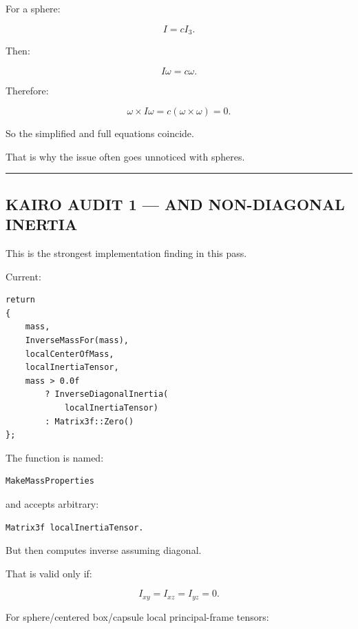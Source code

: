 For a sphere:

\[
I=cI_3.
\]

Then:

\[
I\omega=c\omega.
\]

Therefore:

\[
\omega\times I\omega
=
c(\omega\times\omega)
=
0.
\]

So the simplified and full equations coincide.

That is why the issue often goes unnoticed with spheres.

\begin{center}\rule{0.5\linewidth}{0.5pt}\end{center}

\subsection{\texorpdfstring{KAIRO AUDIT 1 ---  AND NON-DIAGONAL INERTIA}{KAIRO AUDIT 1 --- MakeMassProperties() AND NON-DIAGONAL INERTIA}}\label{06-engine-ii-ch035-kairo-audit-1-makemassproperties-and-non-diagonal-inertia}

\hypertarget{06-engine-ii-ch035-kairo-audit-1-makemassproperties-and-non-diagonal-inertia}{}

This is the strongest implementation finding in this pass.

Current:

\begin{verbatim}
return
{
    mass,
    InverseMassFor(mass),
    localCenterOfMass,
    localInertiaTensor,
    mass > 0.0f
        ? InverseDiagonalInertia(
            localInertiaTensor)
        : Matrix3f::Zero()
};
\end{verbatim}

The function is named:

\begin{verbatim}
MakeMassProperties
\end{verbatim}

and accepts arbitrary:

\begin{verbatim}
Matrix3f localInertiaTensor.
\end{verbatim}

But then computes inverse assuming diagonal.

That is valid only if:

\[
I_{xy}=I_{xz}=I_{yz}=0.
\]

For sphere/centered box/capsule local principal-frame tensors:

